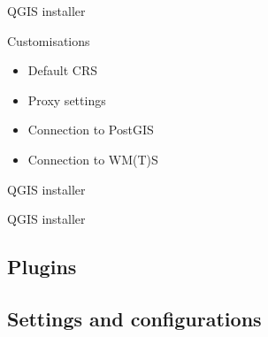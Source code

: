 \begin{frame}{QGIS installer}
	\begin{block}{Customisations}
		\begin{itemize}
			\item Default CRS
			\item Proxy settings
			\item Connection to PostGIS
			\item Connection to WM(T)S
		\end{itemize}
	\end{block}
	
\end{frame}

\begin{frame}{QGIS installer}
	
\end{frame}
\begin{frame}{QGIS installer}
	
\end{frame}

\subsection{Plugins}


\subsection{Settings and configurations}


